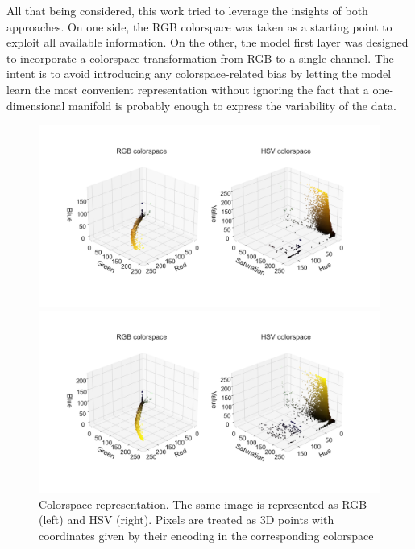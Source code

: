 All that being considered, this work tried to leverage the insights of both approaches. 
On one side, the RGB colorspace was taken as a starting point to exploit all available information. On the other, the model first layer was designed to incorporate a colorspace transformation from RGB to a single channel.
The intent is to avoid introducing any colorspace-related bias by letting the model learn the most convenient representation without ignoring the fact that a one-dimensional manifold is probably enough to express the variability of the data.
\begin{figure}
    \centering
    \includegraphics[width=1.1\textwidth]{figures/120_dataset/colorspace_Mar23bS1C2R3_VLPAGl_200x_y.png}
    
    \centering
    \includegraphics[width=1.1\textwidth]{figures/120_dataset/colorspace_Mar26bS2C1R2_DMl_200x_y.png}
    \caption{Colorspace representation. The same image is represented as RGB (left) and HSV (right). Pixels are treated as 3D points with coordinates given by their encoding in the corresponding colorspace}
    \label{fig:dataset:colorspace}
\end{figure}

